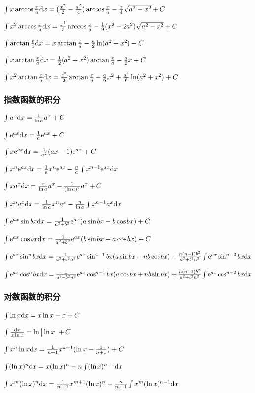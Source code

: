 \begin{footnotesize}
 $ \int x \arccos \frac{x}{a} \mathrm{d} x= (\frac{x^2}{2}-\frac{a^2}{4})\arccos \frac{x}{a} - \frac{x}{4} \sqrt{a^2-x^2}+C $

 $ \int x^2 \arccos \frac{x}{a}\mathrm{d} x= \frac{x^3}{3}\arccos \frac{x}{a} - \frac{1}{9}(x^2+2a^2)\sqrt{a^2-x^2}+C$

 $ \int \arctan \frac{x}{a} \mathrm{d} x=x \arctan \frac{x}{a}-\frac{a}{2}\ln (a^2+x^2)+C $

 $ \int x\arctan \frac{x}{a} \mathrm{d} x = \frac{1}{2}(a^2+x^2)\arctan \frac{x}{a} -\frac{a}{2}x+C $

 $ \int x^2 \arctan \frac{x}{a} \mathrm{d} x= \frac{x^3}{3} \arctan \frac{x}{a} - \frac{a}{6}x^2 + \frac{a^3}{6} \ln (a^2+x^2)+C $


\subsubsection*{指数函数的积分}


 $ \int a^x \mathrm{d} x= \frac{1}{\ln a} a^x + C$

 $ \int \mathrm{e} ^{ax}\mathrm{d} x=\frac{1}{a}\mathrm{e}^{ax}+C $

 $ \int x \mathrm{e}  ^ {ax} \mathrm{d} x=\frac{1}{a^2}(ax-1)\mathrm{e}^{ax} +C $

 $ \int x^n \mathrm{e} ^{ax} \mathrm{d} x=\frac{1}{a}x^n \mathrm{e} ^{ax}-\frac{n}{a} \int x^{n-1} \mathrm{e} ^ {ax} \mathrm{d} x $

 $ \int x a^x \mathrm{d} x = \frac{x}{\ln a}a^x-\frac{1}{(\ln a)^2}a^x+C $

 $ \int x^n a^x \mathrm{d} x= \frac{1}{\ln a}x^n a^x-\frac{n}{\ln a}\int x^{n-1}a^x \mathrm{d} x $

 $ \int \mathrm{e} ^{ax} \sin bx \mathrm{d} x = \frac{1}{a^2+b^2}\mathrm{e} ^{ax}(a \sin bx - b \cos bx)+C $

 $ \int \mathrm{e} ^{ax} \cos bx \mathrm{d} x = \frac{1}{a^2+b^2}\mathrm{e} ^{ax}(b \sin bx + a \cos bx)+C $

 $ \int \mathrm{e} ^{ax} \sin ^ n bx \mathrm{d} x=\frac{1}{a^2+b^2 n^2}\mathrm{e} ^{ax} \sin ^ {n-1} bx (a \sin bx -nb \cos bx) +\frac{n(n-1)b^2}{a^2+b^2 n^2}\int \mathrm{e} ^{ax} \sin ^{n-2} bx \mathrm{d} x $

 $ \int \mathrm{e} ^{ax} \cos ^ n bx \mathrm{d} x=\frac{1}{a^2+b^2 n^2}\mathrm{e} ^{ax} \cos ^ {n-1} bx (a \cos bx +nb \sin bx) +\frac{n(n-1)b^2}{a^2+b^2 n^2}\int \mathrm{e} ^{ax} \cos ^{n-2} bx \mathrm{d} x $

\subsubsection*{对数函数的积分}


 $ \int \ln x \mathrm{d} x = x \ln x - x + C$

 $ \int \frac{\mathrm{d} x}{x \ln x} =\ln \big | \ln x \big |+C $

 $ \int x^n \ln x \mathrm{d} x = \frac{1}{n+1}x^{n+1}(\ln x - \frac{1}{n+1} ) +C $

 $ \int (\ln x)^{n} \mathrm{d} x = x(\ln x)^ n - n \int (\ln x)^{n-1} \mathrm{d} x $

 $ \int x ^ m(\ln x)^n \mathrm{d} x=\frac{1}{m+1}x^{m+1} (\ln x)^n - \frac{n}{m+1} \int x^m(\ln x)^{n-1}\mathrm{d} x $ 

\end{footnotesize}
